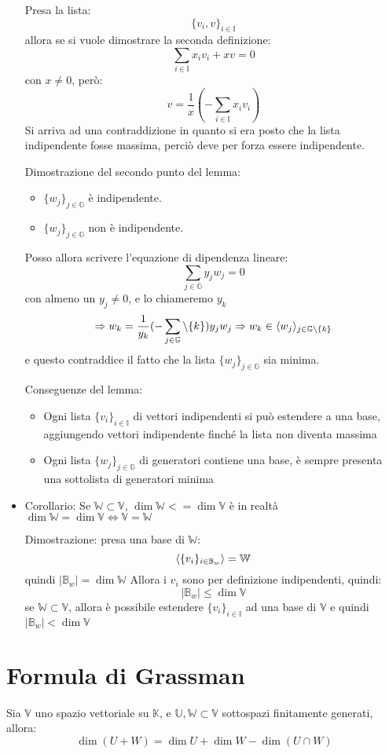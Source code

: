 \documentclass[a4paper,12pt]{article}
\begin{document}
\begin{itemize}
		Presa la lista:
		\[\{v_i, v\}_{i \in \mathbb{I}}\]
		allora se si vuole dimostrare la seconda definizione:
		\[\sum_{i \in \mathbb{I}} x_i v_i + x v = 0\]
		con $x \not = 0$, però:
		\[v = \frac{1}{x}(- \sum_{i \in \mathbb{I}} x_i v_i)\]
		Si arriva ad una contraddizione in quanto si era posto che la lista indipendente fosse massima, perciò deve per forza essere indipendente.
		
		Dimostrazione del secondo punto del lemma:
		\begin{itemize}
			\item $\{w_j\}_{j \in \mathbb{G}}$ è indipendente.
			\item $\{w_j\}_{j \in \mathbb{G}}$ non è indipendente.
		\end{itemize}
		Posso allora scrivere l'equazione di dipendenza lineare:
		\[\sum_{j \in \mathbb{G}} y_j w_j = 0\]
		con almeno un $y_j \not = 0$, e lo chiameremo $y_k$
		\[\Rightarrow w_k = \frac{1}{y_k}(- \sum_{j \in \mathbb{G}} \setminus \{k\}) y_j w_j \Rightarrow w_k \in \langle w_j \rangle_{j \in \mathbb{G} \setminus \{k\}}\]
		e questo contraddice il fatto che la lista $\{w_j\}_{j \in \mathbb{G}}$ sia minima.
		
		Conseguenze del lemma:
		\begin{itemize}
			\item Ogni lista $\{v_i\}_{i \in \mathbb{I}}$ di vettori indipendenti si può estendere a una base, aggiungendo vettori indipendente finché la lista non diventa massima
			\item Ogni lista $\{w_j\}_{j \in \mathbb{G}}$ di generatori contiene una base, è sempre presenta una sottolista di generatori minima
		\end{itemize}
		\item Corollario: Se $\mathbb{W} \subset \mathbb{V}$, $\dim \mathbb{W} <= \dim \mathbb{V}$ è in realtà $\dim \mathbb{W} = \dim \mathbb{V} \iff \mathbb{V} = \mathbb{W}$
		
		Dimostrazione: presa una base di $\mathbb{W}$:
		\[\langle \{v_i\}_{i \in \mathbb{B}_w} \rangle = \mathbb{W}\]
		quindi $|\mathbb{B}_w| = \dim \mathbb{W}$
		Allora i $v_i$ sono per definizione indipendenti, quindi:
		\[|\mathbb{B}_w| \leq \dim \mathbb{V}\]
		se $\mathbb{W} \subset \mathbb{V}$, allora è possibile estendere $\{v_i\}_{i \in \mathbb{I}}$ ad una base di $\mathbb{V}$ e quindi $|\mathbb{B}_w| < \dim \mathbb{V}$
	\end{itemize}
	
	\section{Formula di Grassman}
	Sia $\mathbb{V}$ uno spazio vettoriale su $\mathbb{K}$, e $\mathbb{U}, \mathbb{W} \subset \mathbb{V}$ sottospazi finitamente generati, allora:
	\[\dim (U + W) = \dim U + \dim W - \dim (U \cap W)\] 
	
\end{document}
